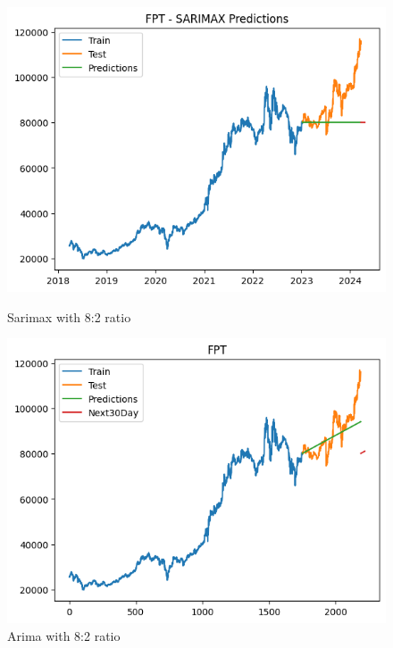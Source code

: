 \documentclass[conference]{IEEEtran}
\begin{document}
\begin{figure}[H]
    \centering
    \begin{minipage}{0.24\textwidth}
        \centering
        \includegraphics[width=\textwidth]{Figure/FPT/sarimax82.png}
        \caption{Sarimax with 8:2 ratio}
        \label{fig:image1}
    \end{minipage}
    \hfill
    \begin{minipage}{0.24\textwidth}
        \centering
        \includegraphics[width=\textwidth]{Figure/FPT/arima82.png}
        \caption{Arima with 8:2 ratio}
        \label{fig:image2}
    \end{minipage}
\end{figure}
\end{document}
